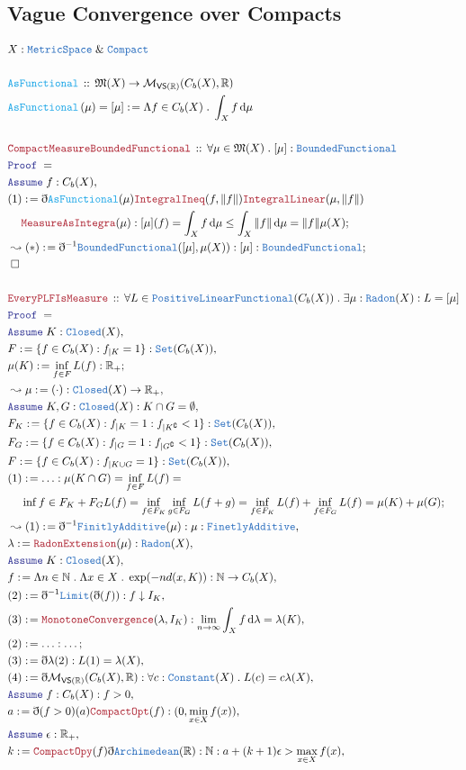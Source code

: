 \documentclass[12pt]{scrartcl}
\newcommand{\TYPE}[1]{\textcolor{NavyBlue}{\mathtt{#1}}}
\newcommand{\FUNC}[1]{\textcolor{Cerulean}{\mathtt{#1}}}
\newcommand{\LOGIC}[1]{\textcolor{Blue}{\mathtt{#1}}}
\newcommand{\THM}[1]{\textcolor{Maroon}{\mathtt{#1}}}
\renewcommand{\.}{\; . \;}
\newcommand{\de}{: \kern 0.1pc =}
\newcommand{\Act}[1]{\left( #1 \right)}
\newcommand{\Theorem}[2]{& \THM{#1} \, :: \, #2 \\ & \Proof = \\ }
\newcommand{\DeclareFunc}[2]{& \FUNC{#1} \, :: \, #2 \\}
\newcommand{\DefineNamedFunc}[4]{&  \FUNC{#1}\Act{#2} = #3 \de #4 \\}
\newcommand{\NewLine}{\\ & \kern 1pc}
\renewcommand{\And}{\; \& \;}
\newcommand{\Reals}{\mathbb{R} }
\newcommand{\Nat}{\mathbb{N} }
\newcommand{\Set}{\TYPE{Set}}
\renewcommand{\c}{\complement}
\newcommand{\Say}[3]{& #1 \de #2 : #3, \\}
\newcommand{\Conclude}[3]{& #1 \de #2 : #3; \\}
\newcommand{\Derive}[3]{& \leadsto #1 \de #2 : #3, \\}
\newcommand{\DeriveConclude}[3]{& \leadsto #1 \de #2 : #3 ; \\}
\newcommand{\A}{\LOGIC{Assume} \;}
\newcommand{\Assume}[2]{& \A #1 : #2, \\}
\newcommand{\QED}{\; \square}
\newcommand{\EndProof}{& \QED \\}
\newcommand{\ByDef}{\eth}
\newcommand{\Proof}{\LOGIC{Proof} \; }
\newcommand{\Mor}{\mathcal{M}}
\newcommand{\MS}{\TYPE{MetricSpace}}
\newcommand{\Compact}{\TYPE{Compact}}
\newcommand{\PLF}{\TYPE{PositiveLinearFunctional}}
\renewcommand{\l}{\lambda}
\begin{document}
\subsection{Vague Convergence over Compacts}
\begin{align*}
& X : \MS \And \Compact \\
\\
\DeclareFunc{ AsFunctional }{ \mathfrak{M}(X) \to \Mor_{\mathsf{VS}(\Reals)}( C_b(X), \Reals  )}
\DefineNamedFunc{ AsFunctional }{ \mu }{[\mu]}{\Lambda  f \in C_b(X) \. \int_X f \, \mathrm{d}\mu }
\\
\Theorem{ CompactMeasureBoundedFunctional }{ \forall \mu \in \mathfrak{M}(X) \. [\mu] : \TYPE{BoundedFunctional} }
\Assume{ f }{ C_b(X) }
\Conclude{(1)}{ \ByDef \FUNC{AsFunctional}(\mu)\THM{IntegralIneq}(f,\|f\|)\THM{IntegralLinear}(\mu,\|f\|)
\NewLine
\THM{MeasureAsIntegra}(\mu) }
{ [\mu](f) = \int_X f \, \mathrm{d} \mu \le \int_X \| f \| \, \mathrm{d} \mu = \| f \| \mu(X) }
\DeriveConclude{(*)}{ \ByDef^{-1}\TYPE{BoundedFunctional}( [\mu], \mu(X)  )  }{ [\mu] : \TYPE{BoundedFunctional}  }
\EndProof
\\
\Theorem{EveryPLFIsMeasure}{ \forall L \in \PLF(C_b(X)) \. \exists \mu : \TYPE{Radon}(X) : L = [\mu]}
\Assume{ K  }{ \TYPE{Closed}(X) }
\Say{ F  }{ \{  f \in C_b(X) : f_{|K} = 1   \}   }{ \Set(C_b(X))  }
\Conclude{ \mu(K) }{ \inf_{f \in F} L(f)   }{ \Reals_+ }
\Derive{\mu}{(\cdot)}{ \TYPE{Closed}(X) \to \Reals_+ }
\Assume{K,G }{ \TYPE{Closed}(X) : K \cap G = \emptyset}
\Say{F_K}{ \{f \in C_b(X) : f_{|K} = 1 :f_{|K^\c} < 1 \} }{\Set(C_b(X))}
\Say{F_G}{ \{f  \in C_b(X) : f_{|G} = 1 : f_{|G^\c} <1 \}  }{\Set(C_b(X))}
\Say{F}{ \{ f \in C_b(X) : f_{| K \cup G} = 1  \} }{\Set(C_b(X))}
\Conclude{(1) }{ \ldots   }{ \mu(K \cap G) = \inf_{f \in F} L( f ) = \NewLine
\inf{f \in F_K + F_G} L( f ) = \inf_{ f \in F_K } \inf_{g \in F_G } L(f + g) = \inf_{f \in F_K} L(f) + \inf_{f \in F_G} L(f) = \mu(K) + \mu(G)}
\Derive{(1)}{\ByDef^{-1}\TYPE{FinitlyAdditive}(\mu)}{\mu : \TYPE{FinetlyAdditive}}
\Say{\lambda}{\THM{RadonExtension}(\mu)}{ \TYPE{Radon}(X) }
\Assume{ K  }{\TYPE{Closed}(X)}
\Say{ f }{ \Lambda n \in \Nat \. \Lambda x \in X \. \exp(-n d(x,K))}{ \Nat \to C_b(X)}
\Say{ (2)}{\ByDef^{-1} \TYPE{Limit}( \ByDef(f) )}{f \downarrow I_K}
\Say{ (3)}{ \THM{MonotoneConvergence}(\l,I_K) }{ \lim_{n \to \infty} \int_X f \, \mathrm{d} \lambda = \lambda(K) }
\Conclude{ (2)  }{\ldots}{\ldots}
\Say{ (3) }{ \ByDef \lambda (2) }{ L(1) = \lambda(X)  }
\Say{ (4) }{ \ByDef \Mor_{\mathsf{VS}(\Reals)}(C_b(X),\Reals) }{ \forall c : \TYPE{Constant}(X) \. L(c)  = c\lambda(X)  }
\Assume{f}{ C_b(X) : f > 0  }
\Say{a}{\ByDef(f > 0 )(a)\THM{CompactOpt}(f)}{ (0, \min_{x \in X} f(x) )  }
\Assume{\epsilon}{\Reals_+}
\Say{k}{\THM{CompactOpy}(f)\ByDef\TYPE{Archimedean}(\Reals) }{ \Nat : a + (k + 1)\epsilon > \max_{x \in X} f(x) }
\end{align*}
\end{document}
